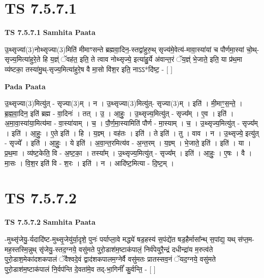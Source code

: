 \documentclass[17pt]{extarticle}
\begin{document}
\section{ TS 7.5.7.1 }

\textbf{TS 7.5.7.1 } \newline
\textbf{Samhita Paata} \newline

उ॒थ्सृज्यां(3)नोथ्सृज्या(3)मिति॑ मीमाꣳसन्ते ब्रह्मवा॒दिन॒-स्तद्वा॑हुरु॒थ् सृज्य॑मे॒वेत्य॑-मावा॒स्या॑यां च पौर्णमा॒स्यां चो॒थ्-सृज्य॒मित्या॑हुरे॒ते हि य॒ज्ञ्ं ॅवह॑त॒ इति॒ ते त्वाव नोथ्सृज्ये॒ इत्या॑हु॒र्ये अ॑वान्त॒रं ॅय॒ज्ञ्ं भे॒जाते॒ इति॒ या प्र॑थ॒मा व्य॑ष्टका॒ तस्या॑मु॒थ्-सृज्य॒मित्या॑हुरे॒ष वै मा॒सो वि॑श॒र इति॒ नाऽऽ*दि॑ष्ट॒ - [  ] \newline

\textbf{Pada Paata} \newline

उ॒थ्सृज्या(3)मित्यु॑त् - सृज्या(3)म् । न । उ॒थ्सृज्या(3)मित्यु॑त्- सृज्या(3)म् । इति॑ । मी॒माꣳ॒॒स॒न्ते॒ । ब्र॒ह्म॒वा॒दिन॒ इति॑ ब्रह्म - वा॒दिनः॑ । तत् । उ॒ । आ॒हुः॒ । उ॒थ्सृज्य॒मित्यु॑त् - सृज्य᳚म् । ए॒व । इति॑ । अ॒मा॒वा॒स्या॑या॒मित्य॑मा - वा॒स्या॑याम् । च॒ । पौ॒र्ण॒मा॒स्यामिति॑ पौर्ण - मा॒स्याम् । च॒ । उ॒थ्सृज्य॒मित्यु॑त् - सृज्य᳚म् । इति॑ । आ॒हुः॒ । ए॒ते इति॑ । हि । य॒ज्ञ्म् । वह॑तः । इति॑ । ते इति॑ । तु । वाव । न । उ॒थ्सृज्ये॒ इत्यु॑त् - सृज्ये᳚ । इति॑ । आ॒हुः॒ । ये इति॑ । अ॒वा॒न्त॒रमित्य॑व - अ॒न्त॒रम् । य॒ज्ञ्म् । भे॒जाते॒ इति॑ । इति॑ । या । प्र॒थ॒मा । व्य॑ष्ट॒केति॒ वि - अ॒ष्ट॒का॒ । तस्या᳚म् । उ॒थ्सृज्य॒मित्यु॑त् - सृज्य᳚म् । इति॑ । आ॒हुः॒ । ए॒षः । वै । मा॒सः । वि॒श॒र इति॑ वि - श॒रः । इति॑ । न । आदि॑ष्ट॒मित्या - दि॒ष्ट॒म् ।  \newline





\section{ TS 7.5.7.2 }

\textbf{TS 7.5.7.2 } \newline
\textbf{Samhita Paata} \newline

-मुथ्सृ॑जेयु॒-र्यदादि॑ष्ट-मुथ्सृ॒जेयु॑र्या॒दृशे॒ पुनः॑ पर्याप्ला॒वे मद्ध्ये॑ षड॒हस्य॑ स॒पंद्ये॑त षड॒हैर्मासा᳚न्थ् स॒पांद्य॒ यथ् स॑प्त॒म- मह॒स्तस्मि॒न्नुथ् सृ॑जेयु॒-स्तद॒ग्नये॒ वसु॑मते पुरो॒डाश॑म॒ष्टाक॑पालं॒ निर्व॑पेयुरै॒न्द्रं दधीन्द्रा॑य म॒रुत्व॑ते पुरो॒डाश॒मेका॑दशकपालं ॅवैश्वदे॒वं द्वाद॑शकपालम॒ग्नेर्वै वसु॑मतः प्रातस्सव॒नं ॅयद॒ग्नये॒ वसु॑मते पुरो॒डाश॑म॒ष्टाक॑पालं नि॒र्वप॑न्ति दे॒वता॑मे॒व तद्-भा॒गिनीं᳚ कु॒र्वन्ति॒ - [  ] \newline
\end{document}
